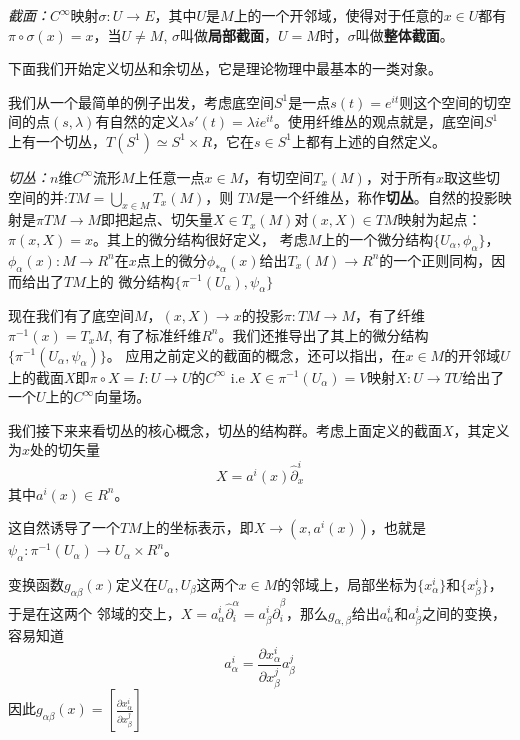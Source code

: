 \documentclass[supercite]{HustGraduPaper}
\begin{document}
\begin{appendices}
		\textit{截面：}$C^\infty$映射$\sigma: U \to E$，其中$U$是$M$上的一个开邻域，使得对于任意的$x \in U$都有$\pi \circ \sigma(x) = x$，当$U \ne M$, $\sigma$叫做\textbf{局部截面}，$U = M$时，$\sigma$叫做\textbf{整体截面}。
		
		下面我们开始定义切丛和余切丛，它是理论物理中最基本的一类对象。
		
		我们从一个最简单的例子出发，考虑底空间$S^1$是一点$s(t) = e^{i t}$则这个空间的切空间的点$(s,\lambda)$有自然的定义$\lambda s'(t) = \lambda i e^{i t}$。使用纤维丛的观点就是，底空间$S^1$上有一个切丛，$T(S^1) \simeq S^1 \times R$，它在$s \in S^1$上都有上述的自然定义。
		
		\textit{切丛：}$n$维$C^\infty$流形$M$上任意一点$x \in M$，有切空间$T_x(M)$，对于所有$x$取这些切空间的并:$TM = \bigcup _{x \in M} T_x(M)$，则
		$TM$是一个纤维丛，称作\textbf{切丛}。自然的投影映射是$\pi TM \to M$即把起点、切矢量$X\in T_x(M)$对$(x,X) \in TM$映射为起点：$\pi(x,X) = x$。其上的微分结构很好定义，
		考虑$M$上的一个微分结构$\{U_\alpha, \phi_\alpha\}$，$\phi_\alpha(x): M \to R^n$在$x$点上的微分$\phi_{*\alpha}(x)$给出$T_x(M) \to R^n$的一个正则同构，因而给出了$TM$上的
		微分结构$\{\pi^{-1}(U_\alpha), \psi_\alpha\}$
		
		现在我们有了底空间$M$，$(x,X) \to x$的投影$\pi: TM \to M$，有了纤维$\pi^{-1}(x) = T_x M $, 有了标准纤维$R^n$。我们还推导出了其上的微分结构$\{\pi^{-1}(U_\alpha,\psi_\alpha)\}$。
		应用之前定义的截面的概念，还可以指出，在$x\in M$的开邻域$U$上的截面$X$即$\pi \circ X = I: U \to U$的$C^\infty$ i.e $X \in \pi^{-1}(U_\alpha) = V$映射$X : U \to TU$给出了一个$U$上的$C^\infty$向量场。
		
		我们接下来来看切丛的核心概念，切丛的结构群。考虑上面定义的截面$X$，其定义为$x$处的切矢量
		\begin{equation}
		X = a^i(x) \hat{\partial}_x^i
		\end{equation}
		其中$a^i(x) \in R^n$。
		
		这自然诱导了一个$TM$上的坐标表示，即$X \to (x, a^i(x))$，也就是$\psi_\alpha: \pi^{-1}(U_\alpha) \to U_\alpha \times R^n$。
		
		变换函数$g_{\alpha \beta}(x)$定义在$U_\alpha, U_\beta$这两个$x \in M$的邻域上，局部坐标为$\{x^i_\alpha\}$和$\{x^i_\beta\}$，于是在这两个
		邻域的交上，$X = a^i_\alpha \hat{\partial}^\alpha_i = a^i_\beta \hat{\partial}^\beta_i$，那么$g_{\alpha,\beta}$给出$a^i_\alpha $和$a^i_\beta$之间的变换，
		容易知道
		\begin{equation}
		a_\alpha^i = \frac{\partial x_\alpha^i}{\partial x_\beta^j}a_\beta^j
		\end{equation}
		因此$g_{\alpha \beta}(x)= [\frac{\partial x_\alpha^i}{\partial x_\beta^j}]$
		

\end{appendices}
\end{document}
